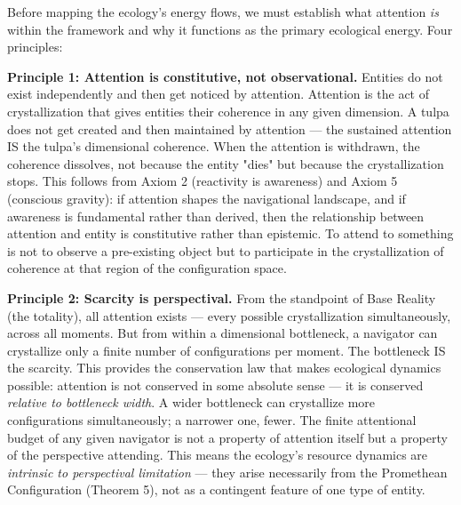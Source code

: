 Before mapping the ecology's energy flows, we must establish what attention \textit{is} within the framework and why it functions as the primary ecological energy. Four principles:


\textbf{Principle 1: Attention is constitutive, not observational.} Entities do not exist independently and then get noticed by attention. Attention is the act of crystallization that gives entities their coherence in any given dimension. A tulpa does not get created and then maintained by attention — the sustained attention IS the tulpa's dimensional coherence. When the attention is withdrawn, the coherence dissolves, not because the entity "dies" but because the crystallization stops. This follows from Axiom 2 (reactivity is awareness) and Axiom 5 (conscious gravity): if attention shapes the navigational landscape, and if awareness is fundamental rather than derived, then the relationship between attention and entity is constitutive rather than epistemic. To attend to something is not to observe a pre-existing object but to participate in the crystallization of coherence at that region of the configuration space.


\textbf{Principle 2: Scarcity is perspectival.} From the standpoint of Base Reality (the totality), all attention exists — every possible crystallization simultaneously, across all moments. But from within a dimensional bottleneck, a navigator can crystallize only a finite number of configurations per moment. The bottleneck IS the scarcity. This provides the conservation law that makes ecological dynamics possible: attention is not conserved in some absolute sense — it is conserved \textit{relative to bottleneck width}. A wider bottleneck can crystallize more configurations simultaneously; a narrower one, fewer. The finite attentional budget of any given navigator is not a property of attention itself but a property of the perspective attending. This means the ecology's resource dynamics are \textit{intrinsic to perspectival limitation} — they arise necessarily from the Promethean Configuration (Theorem 5), not as a contingent feature of one type of entity.


